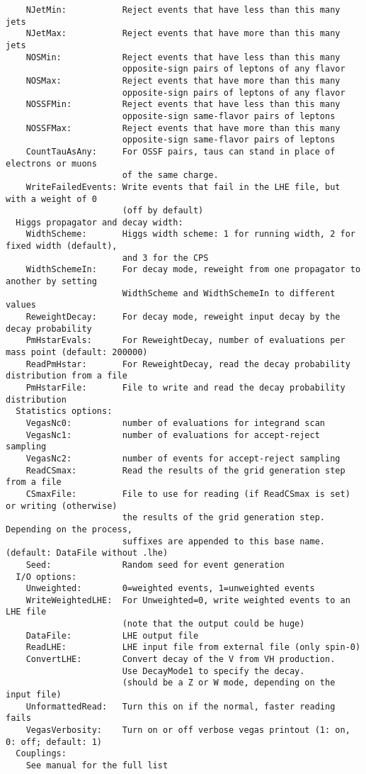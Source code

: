 \documentclass[aps,superscriptaddress,nofootinbib]{revtex4}
\begin{document}
\begin{verbatim}
    NJetMin:           Reject events that have less than this many jets
    NJetMax:           Reject events that have more than this many jets
    NOSMin:            Reject events that have less than this many
                       opposite-sign pairs of leptons of any flavor
    NOSMax:            Reject events that have more than this many
                       opposite-sign pairs of leptons of any flavor
    NOSSFMin:          Reject events that have less than this many
                       opposite-sign same-flavor pairs of leptons
    NOSSFMax:          Reject events that have more than this many
                       opposite-sign same-flavor pairs of leptons
    CountTauAsAny:     For OSSF pairs, taus can stand in place of electrons or muons
                       of the same charge.
    WriteFailedEvents: Write events that fail in the LHE file, but with a weight of 0
                       (off by default)
  Higgs propagator and decay width:
    WidthScheme:       Higgs width scheme: 1 for running width, 2 for fixed width (default),
                       and 3 for the CPS
    WidthSchemeIn:     For decay mode, reweight from one propagator to another by setting
                       WidthScheme and WidthSchemeIn to different values
    ReweightDecay:     For decay mode, reweight input decay by the decay probability
    PmHstarEvals:      For ReweightDecay, number of evaluations per mass point (default: 200000)
    ReadPmHstar:       For ReweightDecay, read the decay probability distribution from a file
    PmHstarFile:       File to write and read the decay probability distribution
  Statistics options:
    VegasNc0:          number of evaluations for integrand scan
    VegasNc1:          number of evaluations for accept-reject sampling
    VegasNc2:          number of events for accept-reject sampling
    ReadCSmax:         Read the results of the grid generation step from a file
    CSmaxFile:         File to use for reading (if ReadCSmax is set) or writing (otherwise)
                       the results of the grid generation step.  Depending on the process,
                       suffixes are appended to this base name. (default: DataFile without .lhe)
    Seed:              Random seed for event generation
  I/O options:
    Unweighted:        0=weighted events, 1=unweighted events
    WriteWeightedLHE:  For Unweighted=0, write weighted events to an LHE file
                       (note that the output could be huge)
    DataFile:          LHE output file
    ReadLHE:           LHE input file from external file (only spin-0)
    ConvertLHE:        Convert decay of the V from VH production.
                       Use DecayMode1 to specify the decay.
                       (should be a Z or W mode, depending on the input file)
    UnformattedRead:   Turn this on if the normal, faster reading fails
    VegasVerbosity:    Turn on or off verbose vegas printout (1: on, 0: off; default: 1)
  Couplings:
    See manual for the full list
\end{verbatim}
\end{document}
